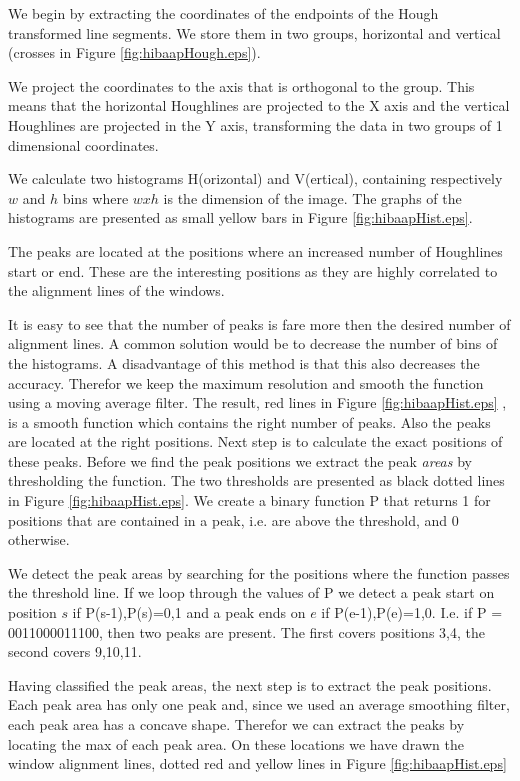 We begin by extracting the coordinates of the endpoints of the Hough transformed line
segments. We store them in two groups, horizontal and vertical (crosses in Figure
\ref{fig:hibaapHough.eps}). 


We project the coordinates to the axis that is orthogonal to the group. This means
that the horizontal Houghlines are projected to the X axis and the vertical
Houghlines are projected in the Y axis, transforming the data in two groups of 1
dimensional coordinates.

We calculate two histograms H(orizontal) and V(ertical), containing respectively
$w$ and $h$ bins where $w x h$ is the dimension of the image.  The graphs of
the histograms are presented as small yellow bars in Figure
\ref{fig:hibaapHist.eps}.

The peaks are located at the positions where an increased number of Houghlines
start or end.  These are the interesting positions as they are highly correlated
to the alignment lines of the windows. 

It is easy to see that the number of peaks is fare more then the desired number of alignment lines.
A common solution would be to decrease the number of bins of the histograms. A
disadvantage of this method is that this also decreases the accuracy. Therefor
we keep the maximum resolution and smooth the function using a moving
average filter.
The result, red lines in Figure \ref{fig:hibaapHist.eps}
, is a smooth function which contains the right number of peaks. Also the peaks
are located at the right positions. Next step is to calculate the exact positions of these peaks.
Before we find the peak positions we extract the peak \emph{areas} by thresholding the
function. The two thresholds are presented as black dotted lines in Figure \ref{fig:hibaapHist.eps}.
We create a binary function P that returns 1 for positions that are contained in
a peak, i.e. are above the threshold, and 0 otherwise.

We detect the peak areas by searching for the positions where the function
passes the threshold line. 
If we loop through the values of P we detect a peak start on position $s$ if {P(s-1),P(s)}={0,1}
and a peak ends on $e$ if {P(e-1),P(e)}={1,0}. 
I.e. if P = 0011000011100, then two peaks are present. The first covers positions {3,4}, 
the second covers {9,10,11}. 

Having classified the peak areas, the next step is to extract the peak positions. 
Each peak area has only one peak and, since we used an average smoothing filter, each
peak area has a concave shape. Therefor we can extract the peaks
by locating the max of each peak area. 
On these locations we have drawn the window alignment lines, dotted red and yellow lines
in Figure \ref{fig:hibaapHist.eps}

